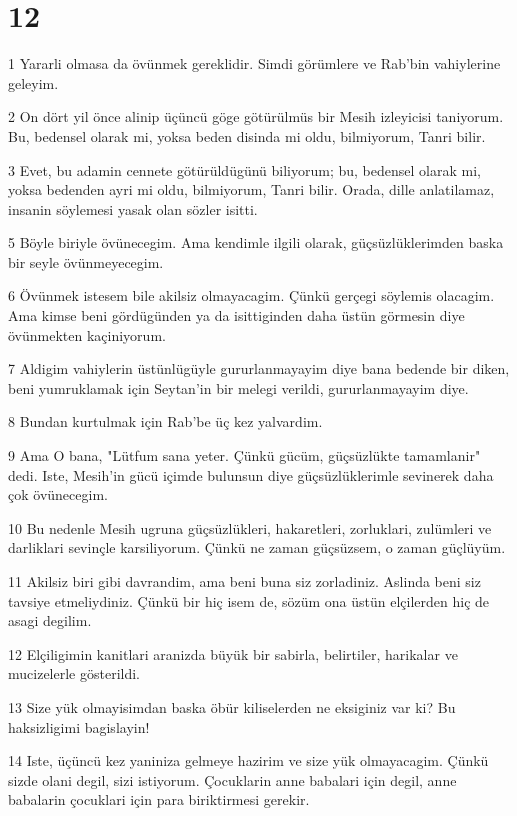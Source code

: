 \chapter{12}

\par 1 Yararli olmasa da övünmek gereklidir. Simdi görümlere ve Rab'bin vahiylerine geleyim.
\par 2 On dört yil önce alinip üçüncü göge götürülmüs bir Mesih izleyicisi taniyorum. Bu, bedensel olarak mi, yoksa beden disinda mi oldu, bilmiyorum, Tanri bilir.
\par 3 Evet, bu adamin cennete götürüldügünü biliyorum; bu, bedensel olarak mi, yoksa bedenden ayri mi oldu, bilmiyorum, Tanri bilir. Orada, dille anlatilamaz, insanin söylemesi yasak olan sözler isitti.
\par 5 Böyle biriyle övünecegim. Ama kendimle ilgili olarak, güçsüzlüklerimden baska bir seyle övünmeyecegim.
\par 6 Övünmek istesem bile akilsiz olmayacagim. Çünkü gerçegi söylemis olacagim. Ama kimse beni gördügünden ya da isittiginden daha üstün görmesin diye övünmekten kaçiniyorum.
\par 7 Aldigim vahiylerin üstünlügüyle gururlanmayayim diye bana bedende bir diken, beni yumruklamak için Seytan'in bir melegi verildi, gururlanmayayim diye.
\par 8 Bundan kurtulmak için Rab'be üç kez yalvardim.
\par 9 Ama O bana, "Lütfum sana yeter. Çünkü gücüm, güçsüzlükte tamamlanir" dedi. Iste, Mesih'in gücü içimde bulunsun diye güçsüzlüklerimle sevinerek daha çok övünecegim.
\par 10 Bu nedenle Mesih ugruna güçsüzlükleri, hakaretleri, zorluklari, zulümleri ve darliklari sevinçle karsiliyorum. Çünkü ne zaman güçsüzsem, o zaman güçlüyüm.
\par 11 Akilsiz biri gibi davrandim, ama beni buna siz zorladiniz. Aslinda beni siz tavsiye etmeliydiniz. Çünkü bir hiç isem de, sözüm ona üstün elçilerden hiç de asagi degilim.
\par 12 Elçiligimin kanitlari aranizda büyük bir sabirla, belirtiler, harikalar ve mucizelerle gösterildi.
\par 13 Size yük olmayisimdan baska öbür kiliselerden ne eksiginiz var ki? Bu haksizligimi bagislayin!
\par 14 Iste, üçüncü kez yaniniza gelmeye hazirim ve size yük olmayacagim. Çünkü sizde olani degil, sizi istiyorum. Çocuklarin anne babalari için degil, anne babalarin çocuklari için para biriktirmesi gerekir.
